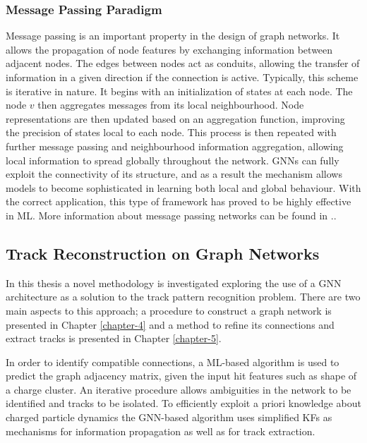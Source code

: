 \subsubsection{Message Passing Paradigm}

Message passing is an important property in the design of graph networks. It allows the propagation of node features by exchanging information between adjacent nodes. The edges between nodes act as conduits, allowing the transfer of information in a given direction if the connection is active. Typically, this scheme is iterative in nature. It begins with an initialization of states at each node. The node $v$ then aggregates messages from its local neighbourhood. Node representations are then updated based on an aggregation function, improving the precision of states local to each node. This process is then repeated with further message passing and neighbourhood information aggregation, allowing local information to spread globally throughout the network. GNNs can fully exploit the connectivity of its structure, and as a result the mechanism allows models to become sophisticated in learning both local and global behaviour. With the correct application, this type of framework has proved to be highly effective in ML. More information about message passing networks can be found in ..


\subsection{Track Reconstruction on Graph Networks}
\label{track-recon-graph-networks}

In this thesis a novel methodology is investigated exploring the use of a GNN architecture as a solution to the track pattern recognition problem. There are two main aspects to this approach; a procedure to construct a graph network is presented in Chapter \ref{chapter-4} and a method to refine its connections and extract tracks is presented in Chapter \ref{chapter-5}. 

In order to identify compatible connections, a ML-based algorithm is used to predict the graph adjacency matrix, given the input hit features such as shape of a charge cluster. An iterative procedure allows ambiguities in the network to be identified and tracks to be isolated. To efficiently exploit a priori knowledge about charged particle dynamics the GNN-based algorithm uses simplified KFs as mechanisms for information propagation as well as for track extraction. 

